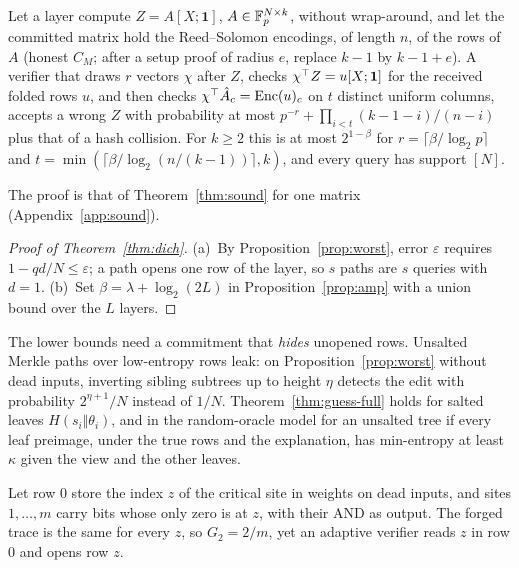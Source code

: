 \begin{proposition}
\label{prop:amp}
Let a layer compute $Z=A[X;\mathbf 1]$, $A\in\mathbb{F}_p^{N\times k}$, without wrap-around, and let the
committed matrix hold the Reed--Solomon encodings, of length $n$, of the rows of $A$ (honest $C_M$;
after a setup proof of radius $e$, replace $k-1$ by $k-1+e$). A verifier that draws $r$ vectors
$\chi$ after $Z$, checks $\chi^\top Z=u[X;\mathbf 1]$ for the received folded rows $u$, and then
checks $\chi^\top\hat A_c=\mathrm{Enc}(u)_c$ on $t$ distinct uniform columns, accepts a wrong $Z$ with
probability at most $p^{-r}+\prod_{i<t}(k-1-i)/(n-i)$ plus that of a hash collision. For $k\ge2$
this is at most $2^{1-\beta}$ for $r=\lceil\beta/\log_2p\rceil$ and
$t=\min(\lceil\beta/\log_2(n/(k-1))\rceil,k)$, and every query has support $[N]$.
\end{proposition}

\noindent The proof is that of Theorem~\ref{thm:sound} for one matrix (Appendix~\ref{app:sound}).

\begin{proof}[Proof of Theorem~\ref{thm:dich}]
(a)~By Proposition~\ref{prop:worst}, error $\varepsilon$ requires $1-qd/N\le\varepsilon$; a path
opens one row of the layer, so $s$ paths are $s$ queries with $d=1$. (b)~Set
$\beta=\lambda+\log_2(2L)$ in Proposition~\ref{prop:amp} with a union bound over the $L$ layers.
\end{proof}

\begin{remark}[commitments]
\label{rem:merkle}
The lower bounds need a commitment that \emph{hides} unopened rows. Unsalted Merkle paths over
low-entropy rows leak: on Proposition~\ref{prop:worst} without dead inputs, inverting sibling
subtrees up to height $\eta$ detects the edit with probability $2^{\eta+1}/N$ instead of $1/N$.
Theorem~\ref{thm:guess-full} holds for salted leaves $H(s_i\Vert\theta_i)$, and in the
random-oracle model for an unsalted tree if every leaf preimage, under the true rows and the
explanation, has min-entropy at least $\kappa$ given the view and the other leaves.
\end{remark}

\begin{remark}
\label{rem:pointer}
Let row $0$ store the index $z$ of the critical site in weights on dead inputs, and sites
$1,\dots,m$ carry bits whose only zero is at $z$, with their AND as output. The forged trace is the
same for every $z$, so $G_2=2/m$, yet an adaptive verifier reads $z$ in row $0$ and opens row $z$.
\end{remark}

